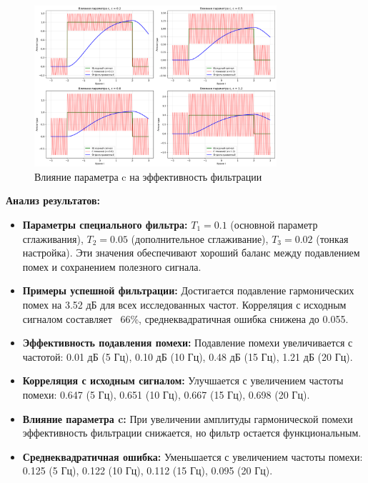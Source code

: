 \begin{figure}[H]
    \centering
    \includegraphics[width=0.8\textwidth]{images/task2/special_filter_c_influence.png}
    \caption{Влияние параметра c на эффективность фильтрации}
    \label{fig:special_filter_c_influence}
\end{figure}

\textbf{Анализ результатов:}
\begin{itemize}
    \item \textbf{Параметры специального фильтра:} $T_1 = 0.1$ (основной параметр сглаживания), $T_2 = 0.05$ (дополнительное сглаживание), $T_3 = 0.02$ (тонкая настройка). Эти значения обеспечивают хороший баланс между подавлением помех и сохранением полезного сигнала.
    
    \item \textbf{Примеры успешной фильтрации:} Достигается подавление гармонических помех на 3.52 дБ для всех исследованных частот. Корреляция с исходным сигналом составляет ~66\%, среднеквадратичная ошибка снижена до 0.055.
    
    \item \textbf{Эффективность подавления помехи:} Подавление помехи увеличивается с частотой: 0.01 дБ (5 Гц), 0.10 дБ (10 Гц), 0.48 дБ (15 Гц), 1.21 дБ (20 Гц).
    
    \item \textbf{Корреляция с исходным сигналом:} Улучшается с увеличением частоты помехи: 0.647 (5 Гц), 0.651 (10 Гц), 0.667 (15 Гц), 0.698 (20 Гц).
    
    \item \textbf{Влияние параметра c:} При увеличении амплитуды гармонической помехи эффективность фильтрации снижается, но фильтр остается функциональным.
    
    \item \textbf{Среднеквадратичная ошибка:} Уменьшается с увеличением частоты помехи: 0.125 (5 Гц), 0.122 (10 Гц), 0.112 (15 Гц), 0.095 (20 Гц).
\end{itemize}

